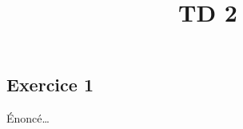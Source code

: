 \documentclass[
  french,
  12pt,
]{article}
\title{TD 2}
\author{}
\date{}
\begin{document}
\maketitle


\subsection{Exercice 1}\label{exercice-1}

Énoncé\ldots{}
\end{document}
